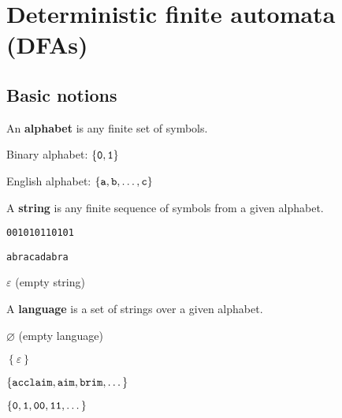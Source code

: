 \documentclass{notes}
\begin{document}
\section{Deterministic finite automata (DFAs)}

\subsection{Basic notions}

\begin{defn}
  An \textbf{alphabet} is any finite set of symbols.
\end{defn}

\begin{eg}
  Binary alphabet: $\left \{ \verb~0~, \verb~1~ \right \}$
\end{eg}

\begin{eg}
  English alphabet: $\left \{ \verb~a~, \verb~b~, \dots, \verb~c~ \right \}$
\end{eg}

\begin{defn}
  A \textbf{string} is any finite sequence of symbols from a given alphabet.
\end{defn}

\begin{eg}
  \verb~001010110101~
\end{eg}

\begin{eg}
  \verb~abracadabra~
\end{eg}

\begin{eg}
  $\varepsilon$ (empty string)
\end{eg}

\begin{defn}
  A \textbf{language} is a set of strings over a given alphabet.
\end{defn}

\begin{eg}
  $\varnothing$ (empty language)
\end{eg}

\begin{eg}
  $\left \{ \varepsilon \right \}$
\end{eg}

\begin{eg}
  $\left \{ \verb~acclaim~, \verb~aim~, \verb~brim~, \dots \right \}$
\end{eg}

\begin{eg}
  $\left \{ \verb~0~, \verb~1~, \verb~00~, \verb~11~, \dots \right \}$
\end{eg}
\end{document}
